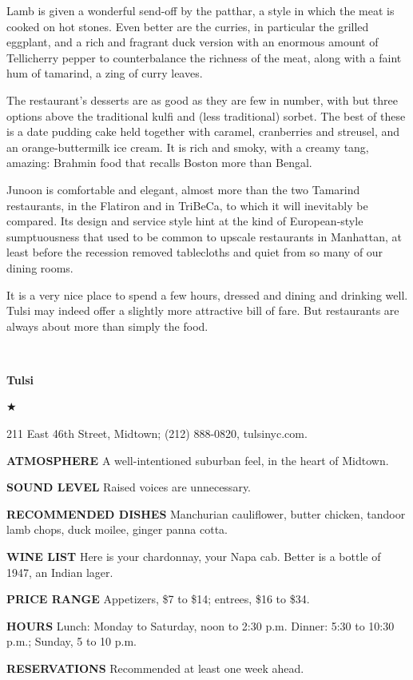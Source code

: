 Lamb is given a wonderful send-off by the patthar, a style in which the
meat is cooked on hot stones. Even better are the curries, in particular
the grilled eggplant, and a rich and fragrant duck version with an
enormous amount of Tellicherry pepper to counterbalance the richness of
the meat, along with a faint hum of tamarind, a zing of curry leaves.

The restaurant's desserts are as good as they are few in number, with
but three options above the traditional kulfi and (less traditional)
sorbet. The best of these is a date pudding cake held together with
caramel, cranberries and streusel, and an orange-buttermilk ice cream.
It is rich and smoky, with a creamy tang, amazing: Brahmin food that
recalls Boston more than Bengal.

Junoon is comfortable and elegant, almost more than the two Tamarind
restaurants, in the Flatiron and in TriBeCa, to which it will inevitably
be compared. Its design and service style hint at the kind of
European-style sumptuousness that used to be common to upscale
restaurants in Manhattan, at least before the recession removed
tablecloths and quiet from so many of our dining rooms.

It is a very nice place to spend a few hours, dressed and dining and
drinking well. Tulsi may indeed offer a slightly more attractive bill of
fare. But restaurants are always about more than simply the food.

~

\textbf{Tulsi}

★

211 East 46th Street, Midtown; (212) 888-0820, tulsinyc.com.

\textbf{ATMOSPHERE} A well-intentioned suburban feel, in the heart of
Midtown.

\textbf{SOUND LEVEL} Raised voices are unnecessary.

\textbf{RECOMMENDED DISHES} Manchurian cauliflower, butter chicken,
tandoor lamb chops, duck moilee, ginger panna cotta.

\textbf{WINE LIST} Here is your chardonnay, your Napa cab. Better is a
bottle of 1947, an Indian lager.

\textbf{PRICE RANGE} Appetizers, \$7 to \$14; entrees, \$16 to \$34.

\textbf{HOURS} Lunch: Monday to Saturday, noon to 2:30 p.m. Dinner: 5:30
to 10:30 p.m.; Sunday, 5 to 10 p.m.

\textbf{RESERVATIONS} Recommended at least one week ahead.

